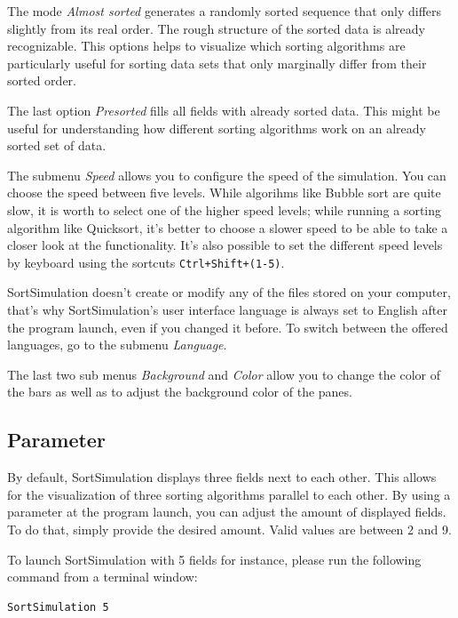 \documentclass[nobranding]{pfBook}
\begin{document}
	The mode \emph{Almost sorted} generates a randomly sorted sequence that only differs slightly from its real order. The rough structure of the sorted data is already recognizable. This options helps to visualize which sorting algorithms are particularly useful for sorting data sets that only marginally differ from their sorted order.
	
	The last option \emph{Presorted} fills all fields with already sorted data. This might be useful for understanding how different sorting algorithms work on an already sorted set of data.
	
	The submenu \emph{Speed} allows you to configure the speed of the simulation. You can choose the speed between five levels. While algorihms like Bubble sort are quite slow, it is worth to select one of the higher speed levels; while running a sorting algorithm like Quicksort, it's better to choose a slower speed to be able to take a closer look at the functionality. It's also possible to set the different speed levels by keyboard using the sortcuts \texttt{Ctrl+Shift+(1-5)}.
	
	SortSimulation doesn't create or modify any of the files stored on your computer, that's why SortSimulation's user interface language is always set to English after the program launch, even if you changed it before. To switch between the offered languages, go to the submenu \emph{Language}.
	
	The last two sub menus \emph{Background} and \emph{Color} allow you to change the color of the bars as well as to adjust the background color of the panes.
	
	\subsection{Parameter}
	\label{StartUpArguments}
	
	By default, SortSimulation displays three fields next to each other. This allows for the visualization of three sorting algorithms parallel to each other. By using a parameter at the program launch, you can adjust the amount of displayed fields. To do that, simply provide the desired amount. Valid values are between 2 and 9.
	
	To launch SortSimulation with 5 fields for instance, please run the following command from a terminal window:
	
	\begin{lstlisting}[style=shell]
SortSimulation 5
	\end{lstlisting}
	
\end{document}
